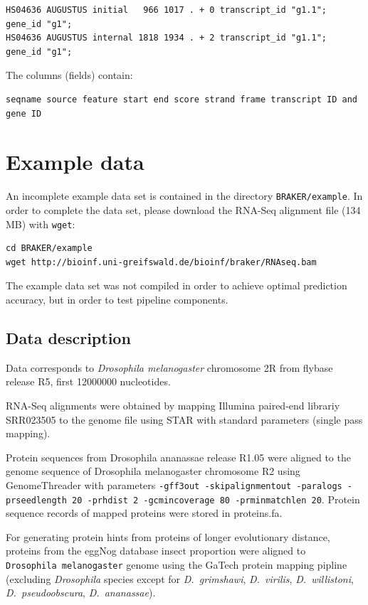 \documentclass[]{article}
\begin{document}
\begin{verbatim}
HS04636 AUGUSTUS initial   966 1017 . + 0 transcript_id "g1.1"; gene_id "g1";
HS04636 AUGUSTUS internal 1818 1934 . + 2 transcript_id "g1.1"; gene_id "g1";
\end{verbatim}

The columns (fields) contain:

\begin{verbatim}
seqname source feature start end score strand frame transcript ID and gene ID
\end{verbatim}

\section{Example data}\label{example-data}

An incomplete example data set is contained in the directory
\texttt{BRAKER/example}. In order to complete the data set, please
download the RNA-Seq alignment file (134 MB) with \texttt{wget}:

\begin{verbatim}
cd BRAKER/example
wget http://bioinf.uni-greifswald.de/bioinf/braker/RNAseq.bam
\end{verbatim}

The example data set was not compiled in order to achieve optimal
prediction accuracy, but in order to test pipeline components.

\subsection{Data description}\label{data-description}

Data corresponds to \emph{Drosophila melanogaster} chromosome 2R from
flybase release R5, first 12000000 nucleotides.

RNA-Seq alignments were obtained by mapping Illumina paired-end librariy
SRR023505 to the genome file using STAR with standard parameters (single
pass mapping).

Protein sequences from Drosophila ananassae release R1.05 were aligned
to the genome sequence of Drosophila melanogaster chromosome R2 using
GenomeThreader with parameters
\texttt{-gff3out\ -skipalignmentout\ -paralogs\ -prseedlength\ 20\ -prhdist\ 2\ -gcmincoverage\ 80\ -prminmatchlen\ 20}.
Protein sequence records of mapped proteins were stored in proteins.fa.

For generating protein hints from proteins of longer evolutionary
distance, proteins from the eggNog database insect proportion were
aligned to \texttt{Drosophila\ melanogaster} genome using the GaTech
protein mapping pipline (excluding \emph{Drosophila} species except for
\emph{D.~grimshawi}, \emph{D.~virilis}, \emph{D.~willistoni},
\emph{D.~pseudoobscura}, \emph{D.~ananassae}).
\end{document}
